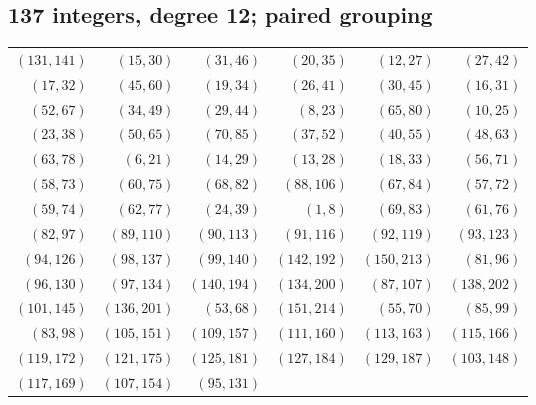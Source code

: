 \subsection*{137 integers, degree 12; paired grouping}
\begingroup\small
\begin{longtable}{rrrrrr}
$(131,141)$ & $(15,30)$ & $(31,46)$ & $(20,35)$ & $(12,27)$ & $(27,42)$\\
$(17,32)$ & $(45,60)$ & $(19,34)$ & $(26,41)$ & $(30,45)$ & $(16,31)$\\
$(52,67)$ & $(34,49)$ & $(29,44)$ & $(8,23)$ & $(65,80)$ & $(10,25)$\\
$(23,38)$ & $(50,65)$ & $(70,85)$ & $(37,52)$ & $(40,55)$ & $(48,63)$\\
$(63,78)$ & $(6,21)$ & $(14,29)$ & $(13,28)$ & $(18,33)$ & $(56,71)$\\
$(58,73)$ & $(60,75)$ & $(68,82)$ & $(88,106)$ & $(67,84)$ & $(57,72)$\\
$(59,74)$ & $(62,77)$ & $(24,39)$ & $(1,8)$ & $(69,83)$ & $(61,76)$\\
$(82,97)$ & $(89,110)$ & $(90,113)$ & $(91,116)$ & $(92,119)$ & $(93,123)$\\
$(94,126)$ & $(98,137)$ & $(99,140)$ & $(142,192)$ & $(150,213)$ & $(81,96)$\\
$(96,130)$ & $(97,134)$ & $(140,194)$ & $(134,200)$ & $(87,107)$ & $(138,202)$\\
$(101,145)$ & $(136,201)$ & $(53,68)$ & $(151,214)$ & $(55,70)$ & $(85,99)$\\
$(83,98)$ & $(105,151)$ & $(109,157)$ & $(111,160)$ & $(113,163)$ & $(115,166)$\\
$(119,172)$ & $(121,175)$ & $(125,181)$ & $(127,184)$ & $(129,187)$ & $(103,148)$\\
$(117,169)$ & $(107,154)$ & $(95,131)$ & & &\\
\end{longtable}
\endgroup
